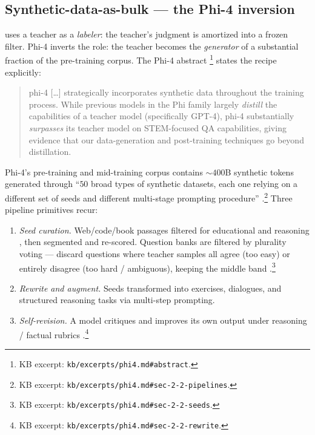 \subsection{Synthetic-data-as-bulk --- the Phi-4 inversion}
\label{sec:data-synthetic}

 uses a teacher  as a \emph{labeler}: the teacher's
judgment is amortized into a frozen filter. Phi-4 \citep{phi4}
inverts the role: the teacher  becomes the \emph{generator} of a
substantial fraction of the pre-training corpus. The Phi-4 abstract
\citep[abstract]{phi4}\footnote{KB excerpt:
\nolinkurl{kb/excerpts/phi4.md#abstract}.} states the recipe explicitly:

\begin{quote}
phi-4 [\dots] strategically incorporates synthetic data throughout
the training process. While previous models in the Phi family largely
\emph{distill} the capabilities of a teacher model (specifically
GPT-4), phi-4 substantially \emph{surpasses} its teacher model on
STEM-focused QA capabilities, giving evidence that our data-generation
and post-training techniques go beyond distillation.
\end{quote}

Phi-4's pre-training and mid-training corpus contains $\sim 400$B
synthetic tokens generated through ``$50$ broad types of synthetic
datasets, each one relying on a different set of seeds and different
multi-stage prompting procedure''
\citep[\S 2.2]{phi4}.\footnote{KB excerpt:
\nolinkurl{kb/excerpts/phi4.md#sec-2-2-pipelines}.} Three pipeline
primitives recur:

\begin{enumerate}
\item \emph{Seed curation.} Web/code/book passages filtered for
educational and reasoning , then segmented and re-scored.
Question banks are filtered by plurality voting --- discard
questions where teacher samples all agree (too easy) or entirely
disagree (too hard / ambiguous), keeping the middle band
\citep[\S 2.2]{phi4}.\footnote{KB excerpt:
\nolinkurl{kb/excerpts/phi4.md#sec-2-2-seeds}.}
\item \emph{Rewrite and augment.} Seeds transformed into exercises,
dialogues, and structured reasoning tasks via multi-step prompting.
\item \emph{Self-revision.} A model critiques and improves its own
output under reasoning / factual rubrics
\citep[\S 2.2]{phi4}.\footnote{KB excerpt:
\nolinkurl{kb/excerpts/phi4.md#sec-2-2-rewrite}.}
\end{enumerate}

